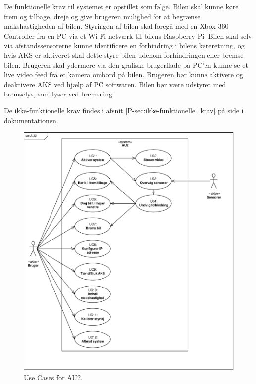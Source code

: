 De funktionelle krav til systemet er opstillet som følge. Bilen skal kunne køre frem og tilbage, dreje og give brugeren mulighed for at begrænse makshastigheden af bilen. 
Styringen af bilen skal foregå med en Xbox-360 Controller fra en PC via et Wi-Fi netværk til bilens Raspberry Pi.
Bilen skal selv via afstandssensorerne kunne identificere en forhindring i bilens køreretning, og hvis AKS er aktiveret skal dette styre bilen udenom forhindringen eller bremse bilen.
Brugeren skal ydermere via den grafiske brugerflade på PC'en kunne se et live video feed fra et kamera ombord på bilen.
Brugeren bør kunne aktivere og deaktivere AKS ved hjælp af PC softwaren.
Bilen bør være udstyret med bremselys, som lyser ved bremsning.

De ikke-funktionelle krav findes i afsnit \ref{P-sec:ikke-funktionelle_krav}  på side \pageref{P-sec:ikke-funktionelle_krav} i dokumentationen.

\clearpage

\begin{figure}[h]
\centering
\includegraphics[width=\textwidth]{../fig/diagrammer/uc_au2}
\caption{Use Cases for AU2.}
\label{fig:use_cases}
\end{figure}